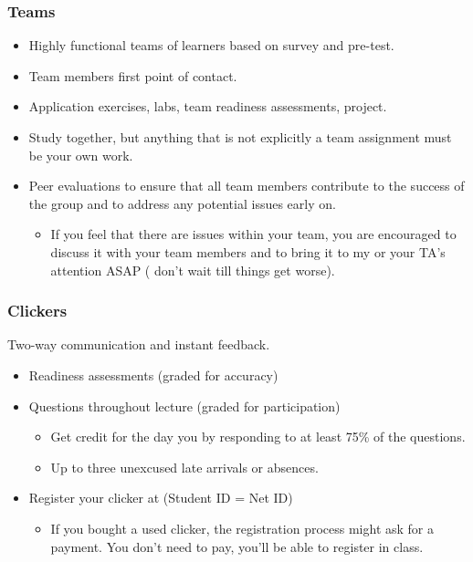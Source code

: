 \documentclass[slidestop,compress,mathserif,12pt,t,professionalfonts,xcolor=table]{beamer}
\begin{document}
\begin{frame}
\frametitle{Teams}

\begin{itemize}
\item Highly functional teams of learners based on survey and pre-test.

\item Team members first point of contact.

\item Application exercises, labs, team readiness assessments, project.

\item Study together, but anything that is not explicitly a team assignment must be 
your own work.

\item Peer evaluations to ensure that all team members contribute to the success of 
the group and to address any potential issues early on.
\begin{itemize}
\item If you feel that there are issues within your team, you are encouraged to 
discuss it with your team members and to bring it to my or your TA's attention ASAP (
don't wait till things get worse).
\end{itemize}

\end{itemize}

\end{frame}


\begin{frame}
\frametitle{Clickers}

 Two-way communication and instant feedback.

\begin{itemize}
\item Readiness assessments (graded for accuracy)

\item Questions throughout lecture (graded for participation)
\begin{itemize}
\item Get credit for the day you by responding to at least 75\% of the questions.
\item Up to three unexcused late arrivals or absences.
\end{itemize}

\item Register your clicker at  
(Student ID = Net ID)
\begin{itemize}
\item If you bought a used clicker, the registration process might ask for a payment. 
You don't need to pay, you'll be able to register in class.
\end{itemize}

\end{itemize}

\end{frame}
\end{document}
